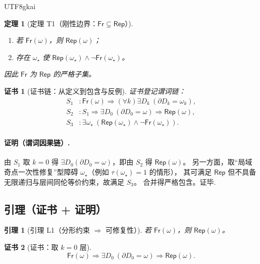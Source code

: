\documentclass[12pt]{article}
\newtheorem{theorem}{定理}[section]
\newtheorem{lemma}{引理}[section]
\newtheorem{Certificate}{证书}[section]
\begin{document}
\begin{CJK*}{UTF8}{gkai}
\begin{theorem}[定理 T1（刚性边界：$\mathsf{Fr}\subsetneq \mathsf{Rep}$）]
\label{thm:tex29-formal-fr-strict}
\begin{enumerate}
  \item 若 $\mathsf{Fr}(\omega)$，则 $\mathsf{Rep}(\omega)$；
  \item 存在 $\omega_\star$ 使 $\mathsf{Rep}(\omega_\star)\wedge \neg\mathsf{Fr}(\omega_\star)$。
\end{enumerate}
因此 $\mathsf{Fr}$ 为 $\mathsf{Rep}$ 的严格子集。
\end{theorem}

\begin{Certificate}[证书链：从定义到包含与反例]
证书登记谓词链：
\[
\begin{aligned}
  S_1 &: \mathsf{Fr}(\omega)\Rightarrow (\forall k)\exists D_k\ (\partial D_k=\omega_k),\\
  S_2 &: S_1\Rightarrow \exists D_0\ (\partial D_0=\omega)\Rightarrow \mathsf{Rep}(\omega),\\
  S_3 &: \exists\omega_\star\ (\mathsf{Rep}(\omega_\star)\wedge \neg\mathsf{Fr}(\omega_\star)).
\end{aligned}
\]
\end{Certificate}

\paragraph{证明（谓词因果链）.}
由 $S_1$ 取 $k=0$ 得 $\exists D_0(\partial D_0=\omega)$，即由 $S_2$ 得 $\mathsf{Rep}(\omega)$。
另一方面，取“局域奇点一次性修复”型障碍 $\omega_\star$（例如 $\tau(\omega_\star)=1$ 的情形），
其可满足 $\mathsf{Rep}$ 但不具备无限递归与层间同伦等价约束，故满足 $S_3$。
合并得严格包含。证毕.

\subsection{引理（证书 + 证明）}
\label{subsec:tex29-formal-lemmas}

\begin{lemma}[引理 L1（分形约束 $\Rightarrow$ 可修复性）]
\label{lem:tex29-formal-fr-implies-rep}
若 $\mathsf{Fr}(\omega)$，则 $\mathsf{Rep}(\omega)$。
\end{lemma}

\begin{Certificate}[证书：取 $k=0$ 层]
\[
  \mathsf{Fr}(\omega)\Rightarrow \exists D_0\ (\partial D_0=\omega)\Rightarrow \mathsf{Rep}(\omega).
\]
\end{Certificate}


\end{CJK*}
\end{document}
